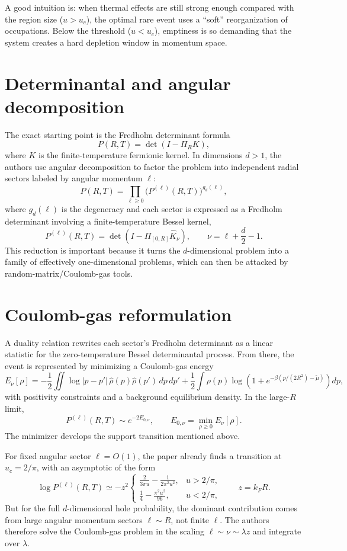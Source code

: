 \documentclass[11pt]{article}
\begin{document}
A good intuition is: when thermal effects are still strong enough compared with the region size ($u>u_c$), the optimal rare event uses a ``soft'' reorganization of occupations. Below the threshold ($u<u_c$), emptiness is so demanding that the system creates a hard depletion window in momentum space.

\section*{Determinantal and angular decomposition}
The exact starting point is the Fredholm determinant formula
\[
P(R,T)=\det(I-\Pi_R K),
\]
where $K$ is the finite-temperature fermionic kernel. In dimensions $d>1$, the authors use angular decomposition to factor the problem into independent radial sectors labeled by angular momentum $\ell$:
\[
P(R,T)=\prod_{\ell\ge0} \big(P^{(\ell)}(R,T)\big)^{g_d(\ell)},
\]
where $g_d(\ell)$ is the degeneracy and each sector is expressed as a Fredholm determinant involving a finite-temperature Bessel kernel,
\[
P^{(\ell)}(R,T)=\det(I-\Pi_{[0,R]} \hat K_\nu),
\qquad \nu=\ell+\frac d2-1.
\]
This reduction is important because it turns the $d$-dimensional problem into a family of effectively one-dimensional problems, which can then be attacked by random-matrix/Coulomb-gas tools.

\section*{Coulomb-gas reformulation}
A duality relation rewrites each sector's Fredholm determinant as a linear statistic for the zero-temperature Bessel determinantal process. From there, the event is represented by minimizing a Coulomb-gas energy
\[
E_\nu[\rho]
= -\frac12\iint \log|p-p'|\,\hat\rho(p)\hat\rho(p')\,dp\,dp'
+ \frac12\int \rho(p)\log\!\left(1+e^{-\beta(p/(2R^2)-\tilde\mu)}\right)dp,
\]
with positivity constraints and a background equilibrium density. In the large-$R$ limit,
\[
P^{(\ell)}(R,T)\sim e^{-2E_{0,\nu}},
\qquad E_{0,\nu}=\min_{\rho\ge0} E_\nu[\rho].
\]
The minimizer develops the support transition mentioned above.

For fixed angular sector $\ell=O(1)$, the paper already finds a transition at $u_c=2/\pi$, with an asymptotic of the form
\[
\log P^{(\ell)}(R,T)\simeq -z^2
\begin{cases}
\frac{2}{3\pi u}-\frac{1}{2\pi^2u^2}, & u>2/\pi,\\
\frac14-\frac{\pi^2u^2}{96}, & u<2/\pi,
\end{cases}
\qquad z=k_FR.
\]
But for the full $d$-dimensional hole probability, the dominant contribution comes from large angular momentum sectors $\ell\sim R$, not finite $\ell$. The authors therefore solve the Coulomb-gas problem in the scaling $\ell\sim \nu\sim \lambda z$ and integrate over $\lambda$.
\end{document}
